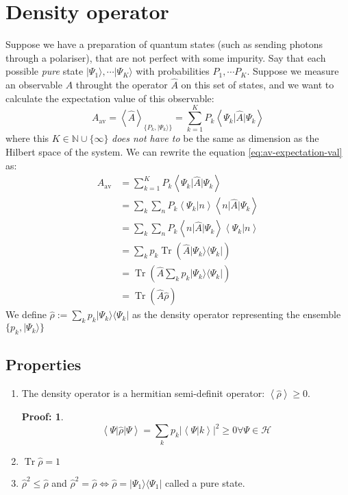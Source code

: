\documentclass[12pt]{book}
\theoremstyle{definition}
\newtheorem*{prf}{Proof:}
\newcommand{\N}{\mathbb N}
\newcommand{\scalar}[1]{\left\langle {#1}\right\rangle}
\newcommand{\abs}[1]{\left\vert {#1}\right\vert}
\let\oldsum\sum
\renewcommand{\sum}[2]{\oldsum\limits_{#1}^{#2}}
\newcommand{\para}[1]{\left( {#1} \right)}
\newcommand{\bra}[1]{\langle {#1} \vert}
\newcommand{\ket}[1]{\vert {#1} \rangle}
\DeclareMathOperator{\tr}{Tr}
\begin{document}
\section{Density operator}
Suppose we have a preparation of quantum states (such as sending photons through a polariser), that are not perfect with some impurity. Say that each possible \emph{pure} state $\ket{\Psi_1}, \cdots \ket{\Psi_K}$ with probabilities $P_1, \cdots P_K$. Suppose we measure an observable $A$ throught the operator $\hat A$ on this set of states, and we want to calculate the expectation value of this observable:
\begin{equation}
  A_{\textrm{av}} = \scalar{\hat A}_{\{P_k, \ket{\Psi_k}\}} = \sum{k=1}{K} P_k \scalar{\Psi_k \vert \hat A \vert \Psi_k} \label{eq:av-expectation-val}
\end{equation}
where this $K \in \N \cup \{\infty\}$ \emph{does not have to} be the same as dimension as the Hilbert space of the system. We can rewrite the equation \ref{eq:av-expectation-val} as:
\begin{align*}
 A_{\textrm{av}} & = \sum{k=1}{K} P_k \scalar{\Psi_k \vert \hat A \vert \Psi_k} \\
 & = \oldsum_k \oldsum_n P_k \scalar{\Psi_k \vert n} \scalar{n \vert \hat A \vert \Psi_k} \\
 & = \oldsum_k \oldsum_n P_k \scalar{n \vert \hat A \vert \Psi_k} \scalar{\Psi_k \vert n} \\
 & = \oldsum_k p_k \tr(\hat A \ket{\Psi_k} \bra{\Psi_k}) \\
 & = \tr\para{\hat A \oldsum_k p_k \ket{\Psi_k} \bra{\Psi_k}} \\
 & = \tr(\hat A \hat \rho)
\end{align*}
We define $\hat \rho := \oldsum_k p_k \ket{\Psi_k} \bra{\Psi_k}$ as the density operator representing the ensemble $\{p_k, \ket{\Psi_k}\}$

\subsection{Properties}
\begin{enumerate}[label = \alph*)]
  \item The density operator is a hermitian semi-definit operator: $\scalar{\hat \rho} \geq 0$. \\
  \begin{prf}
  \begin{equation*}
    \scalar{\Psi \vert \hat \rho \vert \Psi} = \oldsum_k p_k \abs{\scalar{\Psi \vert k}}^2 \geq 0 \forall \Psi \in \mathcal H
  \end{equation*}
  \end{prf}
  \item $\tr \hat \rho = 1$
  \item $\hat{\rho}^2 \leq \hat \rho$ and $\hat \rho^2 = \hat \rho \iff \hat \rho = \ket{\Psi_1}\bra{\Psi_1}$ called a pure state.
\end{enumerate}
\end{document}
